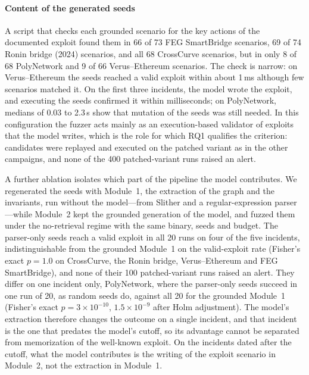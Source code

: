 \documentclass[a4paper]{cas-sc}
\begin{document}
\paragraph{Content of the generated seeds}
A script that checks each grounded scenario for the key actions of the documented exploit found them in 66 of 73 FEG SmartBridge scenarios, 69 of 74 Ronin bridge (2024) scenarios, and all 68 CrossCurve scenarios, but in only 8 of 68 PolyNetwork and 9 of 66 Verus--Ethereum scenarios. The check is narrow: on Verus--Ethereum the seeds reached a valid exploit within about 1\,ms although few scenarios matched it. On the first three incidents, the model wrote the exploit, and executing the seeds confirmed it within milliseconds; on PolyNetwork, medians of 0.03 to 2.3\,s show that mutation of the seeds was still needed. In this configuration the fuzzer acts mainly as an execution-based validator of exploits that the model writes, which is the role for which RQ1 qualifies the criterion: candidates were replayed and executed on the patched variant as in the other campaigns, and none of the 400 patched-variant runs raised an alert.

A further ablation isolates which part of the pipeline the model contributes. We regenerated the seeds with Module~1, the extraction of the graph and the invariants, run without the model---from Slither and a regular-expression parser---while Module~2 kept the grounded generation of the model, and fuzzed them under the no-retrieval regime with the same binary, seeds and budget. The parser-only seeds reach a valid exploit in all 20 runs on four of the five incidents, indistinguishable from the grounded Module~1 on the valid-exploit rate (Fisher's exact $p=1.0$ on CrossCurve, the Ronin bridge, Verus--Ethereum and FEG SmartBridge), and none of their 100 patched-variant runs raised an alert. They differ on one incident only, PolyNetwork, where the parser-only seeds succeed in one run of 20, as random seeds do, against all 20 for the grounded Module~1 (Fisher's exact $p=3\times10^{-10}$, $1.5\times10^{-9}$ after Holm adjustment). The model's extraction therefore changes the outcome on a single incident, and that incident is the one that predates the model's cutoff, so its advantage cannot be separated from memorization of the well-known exploit. On the incidents dated after the cutoff, what the model contributes is the writing of the exploit scenario in Module~2, not the extraction in Module~1.
\end{document}
